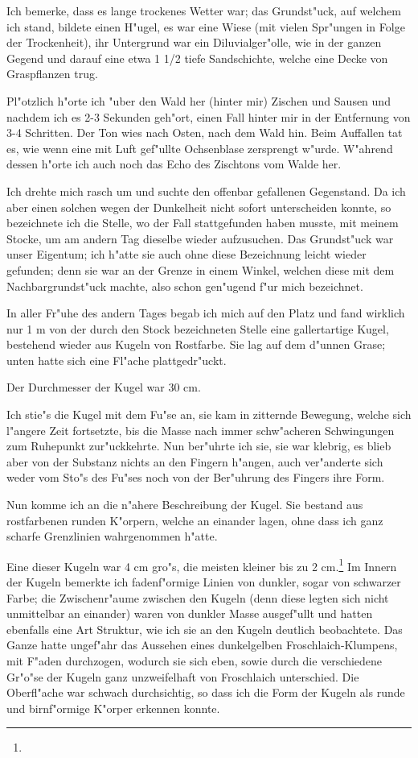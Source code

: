 \documentclass[a4paper, 11pt, oneside, german]{article}
\begin{document}
Ich bemerke, dass es lange trockenes Wetter war; das Grundst"uck, auf welchem ich stand, bildete einen H"ugel, es war eine Wiese (mit vielen Spr"ungen in Folge der Trockenheit), ihr Untergrund war ein Diluvialger"olle, wie in der ganzen Gegend und darauf eine etwa 1 1/2 tiefe Sandschichte, welche eine Decke von Graspflanzen trug.

Pl"otzlich h"orte ich "uber den Wald her (hinter mir) Zischen und Sausen und nachdem ich es 2-3 Sekunden geh"ort, einen Fall hinter mir in der Entfernung von 3-4 Schritten. Der Ton wies nach Osten, nach dem Wald hin. Beim Auffallen tat es, wie wenn eine mit Luft gef"ullte Ochsenblase zersprengt w"urde. W"ahrend dessen h"orte ich auch noch das Echo des Zischtons vom Walde her.

Ich drehte mich rasch um und suchte den offenbar gefallenen Gegenstand. Da ich aber einen solchen wegen der Dunkelheit nicht sofort unterscheiden konnte, so bezeichnete ich die Stelle, wo der Fall stattgefunden haben musste, mit meinem Stocke, um am andern Tag dieselbe wieder aufzusuchen. Das Grundst"uck war unser Eigentum; ich h"atte sie auch ohne diese Bezeichnung leicht wieder gefunden; denn sie war an der Grenze in einem Winkel, welchen diese mit dem Nachbargrundst"uck machte, also schon gen"ugend f"ur mich bezeichnet.

In aller Fr"uhe des andern Tages begab ich mich auf den Platz und fand wirklich nur 1 m von der durch den Stock bezeichneten Stelle eine gallertartige Kugel, bestehend wieder aus Kugeln von Rostfarbe. Sie lag auf dem d"unnen Grase; unten hatte sich eine Fl"ache plattgedr"uckt.

Der Durchmesser der Kugel war 30 cm.

Ich stie"s die Kugel mit dem Fu"se an, sie kam in zitternde Bewegung, welche sich l"angere Zeit fortsetzte, bis die Masse nach immer schw"acheren Schwingungen zum Ruhepunkt zur"uckkehrte. Nun ber"uhrte ich sie, sie war klebrig, es blieb aber von der Substanz nichts an den Fingern h"angen, auch ver"anderte sich weder vom Sto"s des Fu"ses noch von der Ber"uhrung des Fingers ihre Form.

Nun komme ich an die n"ahere Beschreibung der Kugel. Sie bestand aus rostfarbenen runden K"orpern, welche an einander lagen, ohne dass ich ganz scharfe Grenzlinien wahrgenommen h"atte.

Eine dieser Kugeln war 4 cm gro"s, die meisten kleiner bis zu 2 cm.\footnote{} Im Innern der Kugeln bemerkte ich fadenf"ormige Linien von dunkler, sogar von schwarzer Farbe; die Zwischenr"aume zwischen den Kugeln (denn diese legten sich nicht unmittelbar an einander) waren von dunkler Masse ausgef"ullt und hatten ebenfalls eine Art Struktur, wie ich sie an den Kugeln deutlich beobachtete. Das Ganze hatte ungef"ahr das Aussehen eines dunkelgelben Froschlaich-Klumpens, mit F"aden durchzogen, wodurch sie sich eben, sowie durch die verschiedene Gr"o"se der Kugeln ganz unzweifelhaft von Froschlaich unterschied. Die Oberfl"ache war schwach durchsichtig, so dass ich die Form der Kugeln als runde und birnf"ormige K"orper erkennen konnte.
\end{document}
